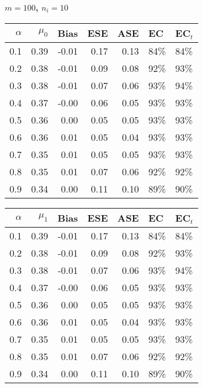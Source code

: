 \documentclass[12pt, letterpaper]{article}
\begin{document}
\clearpage


\begin{center}
	\textbf{$m=100$, $n_i=10$} 
\end{center}
\begin{table}[ht!]
	\centering
	\bgroup
	\def\arraystretch{1.25}
	\setlength\tabcolsep{0.05in}
	\begin{tabular}{rrrrrll}
		\hline
		$\alpha$ & $\mu_0$ & Bias & ESE & ASE & EC & EC$_t$ \\ 
				\hline
		0.1 & 0.39 & -0.01 & 0.17 & 0.13 & 84\% & 84\% \\ 
		0.2 & 0.38 & -0.01 & 0.09 & 0.08 & 92\% & 93\% \\ 
		0.3 & 0.38 & -0.01 & 0.07 & 0.06 & 93\% & 94\% \\ 
		0.4 & 0.37 & -0.00 & 0.06 & 0.05 & 93\% & 93\% \\ 
		0.5 & 0.36 & 0.00 & 0.05 & 0.05 & 93\% & 93\% \\ 
		0.6 & 0.36 & 0.01 & 0.05 & 0.04 & 93\% & 93\% \\ 
		0.7 & 0.35 & 0.01 & 0.05 & 0.05 & 93\% & 93\% \\ 
		0.8 & 0.35 & 0.01 & 0.07 & 0.06 & 92\% & 92\% \\ 
		0.9 & 0.34 & 0.00 & 0.11 & 0.10 & 89\% & 90\% \\ 
	   \hline
	\end{tabular}
	\egroup
	\quad 
	\bgroup
	\setlength\tabcolsep{0.05in}
	\def\arraystretch{1.25}
	\begin{tabular}{rrrrrll}
		\hline
		$\alpha$ & $\mu_1$ & Bias & ESE & ASE & EC & EC$_t$ \\
				 \hline
		0.1 & 0.39 & -0.01 & 0.17 & 0.13 & 84\% & 84\% \\ 
		0.2 & 0.38 & -0.01 & 0.09 & 0.08 & 92\% & 93\% \\ 
		0.3 & 0.38 & -0.01 & 0.07 & 0.06 & 93\% & 94\% \\ 
		0.4 & 0.37 & -0.00 & 0.06 & 0.05 & 93\% & 93\% \\ 
		0.5 & 0.36 & 0.00 & 0.05 & 0.05 & 93\% & 93\% \\ 
		0.6 & 0.36 & 0.01 & 0.05 & 0.04 & 93\% & 93\% \\ 
		0.7 & 0.35 & 0.01 & 0.05 & 0.05 & 93\% & 93\% \\ 
		0.8 & 0.35 & 0.01 & 0.07 & 0.06 & 92\% & 92\% \\ 
		0.9 & 0.34 & 0.00 & 0.11 & 0.10 & 89\% & 90\% \\ 
		\hline
	\end{tabular}

\end{table}
\end{document}

